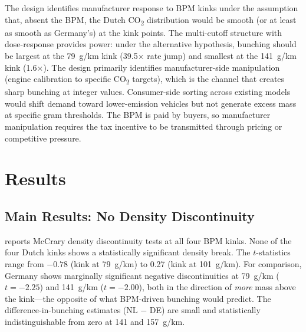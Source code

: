 \documentclass[12pt]{article}
\begin{document}
The design identifies manufacturer response to BPM kinks under the assumption that, absent the BPM, the Dutch CO\textsubscript{2} distribution would be smooth (or at least as smooth as Germany's) at the kink points. The multi-cutoff structure with dose-response provides power: under the alternative hypothesis, bunching should be largest at the 79~g/km kink (39.5$\times$ rate jump) and smallest at the 141~g/km kink (1.6$\times$). The design primarily identifies manufacturer-side manipulation (engine calibration to specific CO\textsubscript{2} targets), which is the channel that creates sharp bunching at integer values. Consumer-side sorting across existing models would shift demand toward lower-emission vehicles but not generate excess mass at specific gram thresholds. The BPM is paid by buyers, so manufacturer manipulation requires the tax incentive to be transmitted through pricing or competitive pressure.

\section{Results}

\subsection{Main Results: No Density Discontinuity}

 reports McCrary density discontinuity tests at all four BPM kinks. None of the four Dutch kinks shows a statistically significant density break. The $t$-statistics range from $-0.78$ (kink at 79~g/km) to 0.27 (kink at 101~g/km). For comparison, Germany shows marginally significant negative discontinuities at 79~g/km ($t = -2.25$) and 141~g/km ($t = -2.00$), both in the direction of \textit{more} mass above the kink---the opposite of what BPM-driven bunching would predict. The difference-in-bunching estimates (NL $-$ DE) are small and statistically indistinguishable from zero at 141 and 157~g/km.


\end{document}
